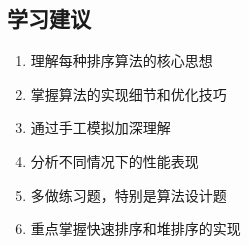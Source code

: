 \documentclass[12pt,a4paper]{amsart}
\begin{document}
\subsection{学习建议}

\begin{enumerate}
\item 理解每种排序算法的核心思想
\item 掌握算法的实现细节和优化技巧
\item 通过手工模拟加深理解
\item 分析不同情况下的性能表现
\item 多做练习题，特别是算法设计题
\item 重点掌握快速排序和堆排序的实现
\end{enumerate}
\end{document}
